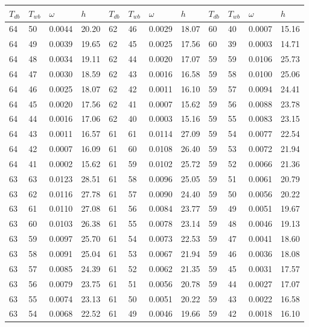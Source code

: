 \begin{tabular}{llll|llll|llll}
 \toprule 
\(T_{db}\) & \(T_{wb}\) & \(\omega\) & \(h\) & \(T_{db}\) & \(T_{wb}\) & \(\omega\) & \(h\) & \(T_{db}\) & \(T_{wb}\) & \(\omega\) & \(h\)  \\ \midrule 
64 & 50 & 0.0044 & 20.20 & 62 & 46 & 0.0029 & 18.07 & 60 & 40 & 0.0007 & 15.16\\
64 & 49 & 0.0039 & 19.65 & 62 & 45 & 0.0025 & 17.56 & 60 & 39 & 0.0003 & 14.71\\
64 & 48 & 0.0034 & 19.11 & 62 & 44 & 0.0020 & 17.07 & 59 & 59 & 0.0106 & 25.73\\
64 & 47 & 0.0030 & 18.59 & 62 & 43 & 0.0016 & 16.58 & 59 & 58 & 0.0100 & 25.06\\
64 & 46 & 0.0025 & 18.07 & 62 & 42 & 0.0011 & 16.10 & 59 & 57 & 0.0094 & 24.41\\
64 & 45 & 0.0020 & 17.56 & 62 & 41 & 0.0007 & 15.62 & 59 & 56 & 0.0088 & 23.78\\
64 & 44 & 0.0016 & 17.06 & 62 & 40 & 0.0003 & 15.16 & 59 & 55 & 0.0083 & 23.15\\
64 & 43 & 0.0011 & 16.57 & 61 & 61 & 0.0114 & 27.09 & 59 & 54 & 0.0077 & 22.54\\
64 & 42 & 0.0007 & 16.09 & 61 & 60 & 0.0108 & 26.40 & 59 & 53 & 0.0072 & 21.94\\
64 & 41 & 0.0002 & 15.62 & 61 & 59 & 0.0102 & 25.72 & 59 & 52 & 0.0066 & 21.36\\
63 & 63 & 0.0123 & 28.51 & 61 & 58 & 0.0096 & 25.05 & 59 & 51 & 0.0061 & 20.79\\
63 & 62 & 0.0116 & 27.78 & 61 & 57 & 0.0090 & 24.40 & 59 & 50 & 0.0056 & 20.22\\
63 & 61 & 0.0110 & 27.08 & 61 & 56 & 0.0084 & 23.77 & 59 & 49 & 0.0051 & 19.67\\
63 & 60 & 0.0103 & 26.38 & 61 & 55 & 0.0078 & 23.14 & 59 & 48 & 0.0046 & 19.13\\
63 & 59 & 0.0097 & 25.70 & 61 & 54 & 0.0073 & 22.53 & 59 & 47 & 0.0041 & 18.60\\
63 & 58 & 0.0091 & 25.04 & 61 & 53 & 0.0067 & 21.94 & 59 & 46 & 0.0036 & 18.08\\
63 & 57 & 0.0085 & 24.39 & 61 & 52 & 0.0062 & 21.35 & 59 & 45 & 0.0031 & 17.57\\
63 & 56 & 0.0079 & 23.75 & 61 & 51 & 0.0056 & 20.78 & 59 & 44 & 0.0027 & 17.07\\
63 & 55 & 0.0074 & 23.13 & 61 & 50 & 0.0051 & 20.22 & 59 & 43 & 0.0022 & 16.58\\
63 & 54 & 0.0068 & 22.52 & 61 & 49 & 0.0046 & 19.66 & 59 & 42 & 0.0018 & 16.10\\

\end{tabular}
